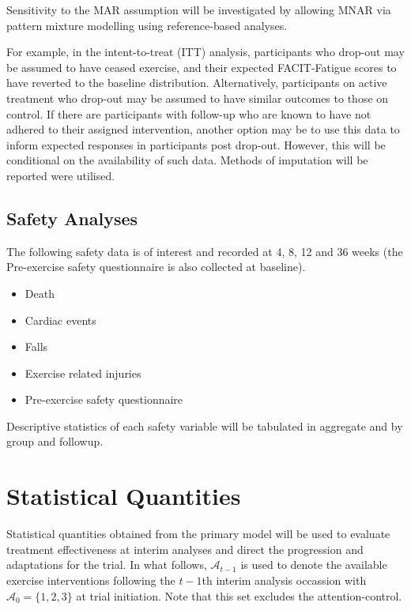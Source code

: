 \documentclass[11pt,parskip=half-]{scrartcl}
\providecommand{\tightlist}{%
  \setlength{\itemsep}{0pt}\setlength{\parskip}{0pt}}
\begin{document}
Sensitivity to the MAR assumption will be investigated by allowing MNAR via pattern mixture modelling using reference-based analyses.

For example, in the intent-to-treat (ITT) analysis, participants who drop-out may be assumed to have ceased exercise, and their expected FACIT-Fatigue scores to have reverted to the baseline distribution. Alternatively, participants on active treatment who drop-out may be assumed to have similar outcomes to those on control. If there are participants with follow-up who are known to have not adhered to their assigned intervention, another option may be to use this data to inform expected responses in participants post drop-out. However, this will be conditional on the availability of such data. Methods of imputation will be reported were utilised.

\subsection{Safety Analyses}\label{safety-analyses}

The following safety data is of interest and recorded at 4, 8, 12 and 36 weeks (the Pre-exercise safety questionnaire is also collected at baseline).

\begin{itemize}\tightlist
  \item Death
  \item Cardiac events
  \item Falls
  \item Exercise related injuries
  \item Pre-exercise safety questionnaire
\end{itemize}

Descriptive statistics of each safety variable will be tabulated in aggregate and by group and followup.

\clearpage

\section{Statistical Quantities}\label{statistical-quantities}

Statistical quantities obtained from the primary model will be used to evaluate treatment effectiveness at interim analyses and direct the progression and adaptations for the trial. In what follows, $\mathcal{A}_{t-1}$ is used to denote the available exercise interventions following the $t-1$th interim analysis occassion with $\mathcal{A}_0=\{1,2,3\}$ at trial initiation. Note that this set excludes the attention-control.
\end{document}

